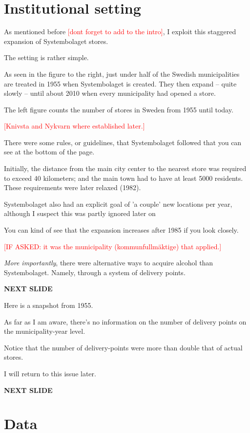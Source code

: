 \documentclass[12pt]{article}
\newcommand{\TODO}[1]{\textcolor{red}{[#1]}}
\begin{document}
\section{Institutional setting}

 As mentioned before \TODO{dont forget to add to the intro}, I exploit this staggered expansion of Systembolaget stores. 
 
 The setting is rather simple. 

 As seen in the figure to the right, just under half of the Swedish municipalities are treated in 1955 when Systembolaget is created. They then expand -- quite slowly -- until about 2010 when every municipality had opened a store. 
 
 The left figure counts the number of stores in Sweden from 1955 until today.

 \TODO{Knivsta and Nykvarn where established later.}

 There were some rules, or guidelines, that Systembolaget followed that you can see at the bottom of the page.

 Initially, the distance from the main city center to the nearest store was required to exceed 40 kilometers; and the main town had to have at least 5000 residents. These requirements were later relaxed (1982).

 Systembolaget also had an explicit goal of 'a couple' new locations per year, although I suspect this was partly ignored later on
 
 You can kind of see that the expansion increases after 1985 if you look closely.

 \TODO{IF ASKED: it was the municipality (kommunfullmäktige) that applied.}

\emph{More importantly}, there were alternative ways to acquire alcohol than Systembolaget. Namely, through a system of delivery points.

\textbf{NEXT SLIDE}

Here is a snapshot from 1955. 

As far as I am aware, there's no information on the number of delivery points on the municipality-year level. 

Notice that the number of delivery-points were more than double that of actual stores.

I will return to this issue later.

\textbf{NEXT SLIDE}

\section{Data}
\end{document}
